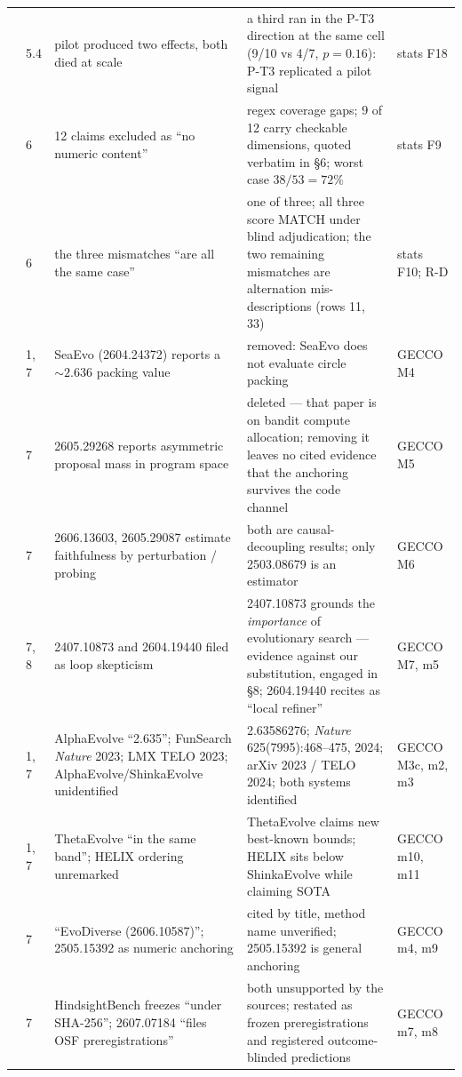 \documentclass[11pt]{article}
\begin{document}
\begin{longtable}{L{0.4cm}L{1.0cm}L{4.1cm}L{6.4cm}L{1.8cm}}
 & 5.4 & pilot produced two effects, both died at scale & a third ran in the P-T3 direction at the same cell (9/10 vs 4/7, $p = 0.16$): P-T3 replicated a pilot signal & stats F18 \\
 & 6 & 12 claims excluded as ``no numeric content'' & regex coverage gaps; 9 of 12 carry checkable dimensions, quoted verbatim in \S6; worst case $38/53 = 72\%$ & stats F9 \\
 & 6 & the three mismatches ``are all the same case'' & one of three; all three score MATCH under blind adjudication; the two remaining mismatches are alternation mis-descriptions (rows 11, 33) & stats F10; R-D \\
 & 1, 7 & SeaEvo (2604.24372) reports a ${\sim}2.636$ packing value & removed: SeaEvo does not evaluate circle packing & GECCO M4 \\
 & 7 & 2605.29268 reports asymmetric proposal mass in program space & deleted --- that paper is on bandit compute allocation; removing it leaves no cited evidence that the anchoring survives the code channel & GECCO M5 \\
 & 7 & 2606.13603, 2605.29087 estimate faithfulness by perturbation / probing & both are causal-decoupling results; only 2503.08679 is an estimator & GECCO M6 \\
 & 7, 8 & 2407.10873 and 2604.19440 filed as loop skepticism & 2407.10873 grounds the \textit{importance} of evolutionary search --- evidence against our substitution, engaged in \S8; 2604.19440 recites as ``local refiner'' & GECCO M7, m5 \\
 & 1, 7 & AlphaEvolve ``2.635''; FunSearch \textit{Nature} 2023; LMX TELO 2023; AlphaEvolve/ShinkaEvolve unidentified & 2.63586276; \textit{Nature} 625(7995):468--475, 2024; arXiv 2023 / TELO 2024; both systems identified & GECCO M3c, m2, m3 \\
 & 1, 7 & ThetaEvolve ``in the same band''; HELIX ordering unremarked & ThetaEvolve claims new best-known bounds; HELIX sits below ShinkaEvolve while claiming SOTA & GECCO m10, m11 \\
 & 7 & ``EvoDiverse (2606.10587)''; 2505.15392 as numeric anchoring & cited by title, method name unverified; 2505.15392 is general anchoring & GECCO m4, m9 \\
 & 7 & HindsightBench freezes ``under SHA-256''; 2607.07184 ``files OSF preregistrations'' & both unsupported by the sources; restated as frozen preregistrations and registered outcome-blinded predictions & GECCO m7, m8 \\

\end{longtable}
\end{document}
